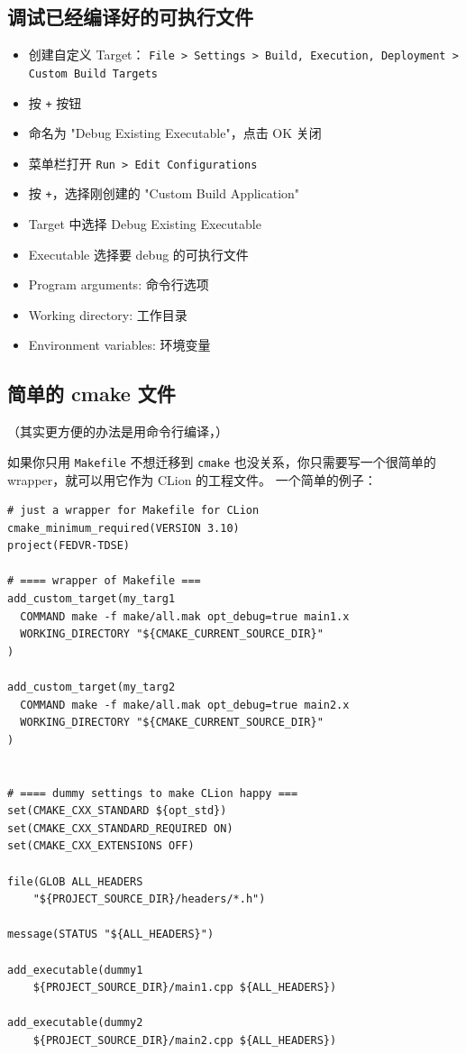 \subsection{调试已经编译好的可执行文件}\label{sub_CLionN_1}
\begin{itemize}
\item 创建自定义 Target： \verb`File > Settings > Build, Execution, Deployment > Custom Build Targets`
\item 按 \verb`+` 按钮
\item 命名为 "Debug Existing Executable"，点击 OK 关闭
\item 菜单栏打开 \verb`Run > Edit Configurations`
\item 按 \verb`+`，选择刚创建的 "Custom Build Application"
\item Target 中选择 Debug Existing Executable
\item Executable 选择要 debug 的可执行文件
\item Program arguments: 命令行选项
\item Working directory: 工作目录
\item Environment variables: 环境变量
\end{itemize}

\subsection{简单的 cmake 文件}
（其实更方便的办法是用命令行编译，）

如果你只用 \verb`Makefile` 不想迁移到 \verb`cmake` 也没关系，你只需要写一个很简单的 wrapper，就可以用它作为 CLion 的工程文件。 一个简单的例子：
\begin{lstlisting}[language=none]
# just a wrapper for Makefile for CLion
cmake_minimum_required(VERSION 3.10)
project(FEDVR-TDSE)

# ==== wrapper of Makefile ===
add_custom_target(my_targ1
  COMMAND make -f make/all.mak opt_debug=true main1.x
  WORKING_DIRECTORY "${CMAKE_CURRENT_SOURCE_DIR}"
)

add_custom_target(my_targ2
  COMMAND make -f make/all.mak opt_debug=true main2.x
  WORKING_DIRECTORY "${CMAKE_CURRENT_SOURCE_DIR}"
)


# ==== dummy settings to make CLion happy ===
set(CMAKE_CXX_STANDARD ${opt_std})
set(CMAKE_CXX_STANDARD_REQUIRED ON)
set(CMAKE_CXX_EXTENSIONS OFF)

file(GLOB ALL_HEADERS
    "${PROJECT_SOURCE_DIR}/headers/*.h")

message(STATUS "${ALL_HEADERS}")

add_executable(dummy1
    ${PROJECT_SOURCE_DIR}/main1.cpp ${ALL_HEADERS})

add_executable(dummy2
    ${PROJECT_SOURCE_DIR}/main2.cpp ${ALL_HEADERS})
\end{lstlisting}

